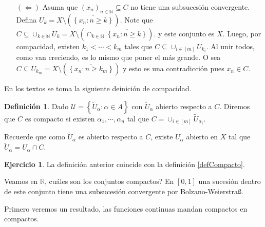 \documentclass[12pt]{article}
\theoremstyle{plain}
\theoremstyle{definition}
\newtheorem{Def}[Th]{Definición}       %
\newtheorem{Ej}[Th]{Ejercicio}
\theoremstyle{remark}
\numberwithin{equation}{section}
\newcommand{\bN}{\mathbb{N}}        %
\newcommand{\bR}{\mathbb{R}}        %
\newcommand{\cU}{\mathcal{U}}       %
\renewcommand{\geq}{\geqslant}      %
\renewcommand{\:}{\colon}           %
\newcommand{\conj}[1]{\left\lbrace#1\right\rbrace}
\newcommand{\bonj}[1]{\left\lbrack#1\right\rbrack}
\begin{document}
\begin{multicols}{2}
\begin{ptcbp}
\begin{enumerate}
  \item[$(\Leftarrow)$] Asuma que $(x_n)_{n\in\bN}\subseteq C$ no tiene una subsucesión convergente. Defina $U_k=X\setminus (\overline{\conj{x_n\colon n\geq k}})$. Note que $C\subseteq\cup_{k\in\bN}U_k=X\setminus (\cap_{k\in\bN}\overline{\conj{x_n\colon n\geq k}})$.
      y este conjunto es $X$. Luego, por compacidad, existen $k_1<\cdots<k_m$ tales que $C\subseteq\cup_{i\in\bonj{m}}U_{k_i}$. Al unir todos, como van creciendo, es lo mismo que poner el más grande. O sea $C\subseteq U_{k_m}=X\setminus (\overline{\conj{x_n\colon n\geq k_m}})$ y esto es una contradicción pues $x_n\in C$.
\end{enumerate}
\end{ptcbp}

En los textos se toma la siguiente deinición de compacidad.
\begin{Def}
  Dado $\cU=\conj{\widetilde{U}_\alpha\colon \alpha\in A}$ con $\widetilde{U}_\alpha$ abierto respecto a $C$. Diremos que $C$ es compacto si existen $\alpha_1,\cdots,\alpha_n$ tal que $C=\cup_{i\in\bonj{m}}\widetilde{U}_{\alpha_i}$.
\end{Def}

Recuerde que como $\widetilde{U}_\alpha$ es abierto respecto a $C$, existe $U_\alpha$ abierto en $X$ tal que $\widetilde{U}_\alpha=U_\alpha\cap C$.
\begin{Ej}
  La definición anterior coincide con la definición \ref{defCompacto}.
\end{Ej}

\begin{ptcb}

\end{ptcb}
Veamos en $\bR$, cuáles son los conjuntos compactos? En $\bonj{0,1}$ una sucesión dentro de este conjunto tiene una subsucesión convergente por Bolzano-Weierstra{\ss}.\par
Primero veremos un resultado, las funciones continuas mandan compactos en compactos.


\end{multicols}
\end{document}
